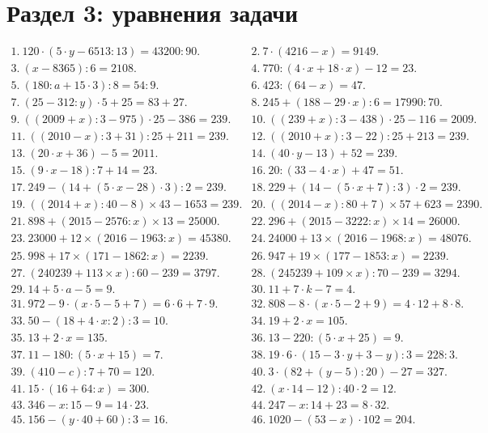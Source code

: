 \documentclass[12pt]{article}
\begin{document}
\section{Раздел 3: уравнения задачи}
$\begin{array}{ll}
1.\ 120\cdot(5\cdot y-6513:13)=43200:90.&
2.\ 7\cdot(4216-x)=9149.\\
3.\ (x-8365):6=2108.&
4.\ 770:(4\cdot x+18\cdot x)-12=23.\\
5.\ (180:a+15\cdot3):8=54:9.&
6.\ 423:(64-x)=47.\\
7.\ (25-312:y)\cdot5+25=83+27.&
8.\ 245+(188-29\cdot x):6=17990:70.\\
9.\ ((2009+x):3-975)\cdot25-386=239.&
10.\ ((239+x):3-438)\cdot25-116=2009.\\
11.\ ((2010-x):3+31):25+211=239.&
12.\ ((2010+x):3-22):25+213=239.\\
13.\ (20\cdot x+36)-5=2011.&
14.\ (40\cdot y-13)+52=239.\\
15.\ (9\cdot x-18):7+14=23.&
16.\ 20:(33-4\cdot x)+47=51.\\
17.\ 249-(14+(5\cdot x-28)\cdot 3):2=239.&
18.\ 229+(14-(5\cdot x+7):3)\cdot2=239.\\
19.\ ((2014+x):40-8)\times43-1653=239.&
20.\ ((2014-x):80+7)\times57+623=2390.\\
21.\ 898+(2015-2576:x)\times 13=25000.&
22.\ 296+(2015-3222:x)\times 14=26000.\\
23.\ 23000+12\times (2016-1963:x)=45380.&
24.\ 24000+13\times(2016-1968:x)=48076.\\
25.\ 998+17\times(171-1862:x)=2239.&
26.\ 947+19\times(177-1853:x)=2239.\\
27.\ (240239+113\times x):60-239=3797.&
28.\ (245239+109\times x):70-239=3294.\\
29.\ 14+5\cdot a-5=9.&
30.\ 11+7\cdot k-7=4.\\
31.\ 972-9\cdot(x\cdot 5-5+7)=6\cdot6+7\cdot9.&
32.\ 808-8\cdot(x\cdot5-2+9)=4\cdot12+8\cdot8.\\
33.\ 50-(18+4\cdot x:2):3=10.&
34.\ 19+2\cdot x=105.\\
35.\ 13+2\cdot x=135.&
36.\ 13-220:(5\cdot x+25)=9.\\
37.\ 11-180:(5\cdot x+15)=7.&
38.\ 19\cdot6\cdot(15-3\cdot y+3-y):3=228:3.\\
39.\ (410-c):7+70=120.&
40.\ 3\cdot(82+(y-5):20)-27=327.\\
41.\ 15\cdot(16+64:x)=300.&
42.\ (x\cdot14-12):40\cdot2=12.\\
43.\ 346-x:15-9=14\cdot23.&
44.\ 247-x:14+23=8\cdot32.\\
45.\ 156-(y\cdot40+60):3=16.&
46.\ 1020-(53-x)\cdot102=204.\end{array}$\\
\end{document}
